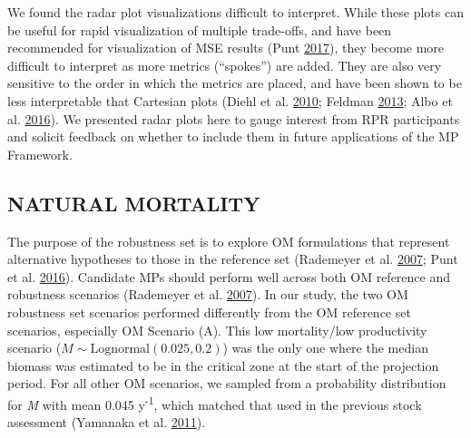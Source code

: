 \documentclass[11pt]{book}
\begin{document}
We found the radar plot visualizations difficult to interpret. While these plots can be useful for rapid visualization of multiple trade-offs, and have been recommended for visualization of MSE results (Punt \protect\hyperlink{ref-punt2017}{2017}), they become more difficult to interpret as more metrics (``spokes'') are added. They are also very sensitive to the order in which the metrics are placed, and have been shown to be less interpretable that Cartesian plots (Diehl et al. \protect\hyperlink{ref-diehl2010}{2010}; Feldman \protect\hyperlink{ref-feldman2013}{2013}; Albo et al. \protect\hyperlink{ref-albo2016}{2016}). We presented radar plots here to gauge interest from RPR participants and solicit feedback on whether to include them in future applications of the MP Framework.

\hypertarget{sec:discussion-m}{%
\subsection{NATURAL MORTALITY}\label{sec:discussion-m}}

The purpose of the robustness set is to explore OM formulations that represent alternative hypotheses to those in the reference set (Rademeyer et al. \protect\hyperlink{ref-rademeyer2007}{2007}; Punt et al. \protect\hyperlink{ref-punt2016}{2016}). Candidate MPs should perform well across both OM reference and robustness scenarios (Rademeyer et al. \protect\hyperlink{ref-rademeyer2007}{2007}). In our study, the two OM robustness set scenarios performed differently from the OM reference set scenarios, especially OM Scenario (A). This low mortality/low productivity scenario (\(M \sim \textrm{Lognormal}(0.025, 0.2)\)) was the only one where the median biomass was estimated to be in the critical zone at the start of the projection period. For all other OM scenarios, we sampled from a probability distribution for \emph{M} with mean 0.045 y\textsuperscript{-1}, which matched that used in the previous stock assessment (Yamanaka et al. \protect\hyperlink{ref-yamanaka2011}{2011}).
\end{document}
